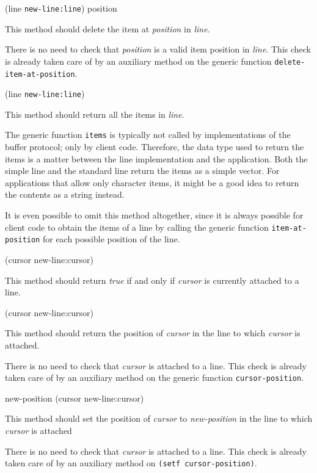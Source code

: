  {(line \texttt{new-line:line}) position}

This method should delete the item at \textit{position} in \textit{line}.

There is no need to check that \textit{position} is a valid item
position in \textit{line}.  This check is already taken care of by an
auxiliary method on the generic function
\texttt{delete-item-at-position}.

 {(line \texttt{new-line:line})}

This method should return all the items in \textit{line}.

The generic function \texttt{items} is typically not called by
implementations of the buffer protocol; only by client code.
Therefore, the data type used to return the items is a matter between
the line implementation and the application.  Both the simple line
 and the standard line
 return the items as a simple
vector.  For applications that allow only character items, it might be
a good idea to return the contents as a string instead.

It is even possible to omit this method altogether, since it is always
possible for client code to obtain the items of a line by calling the
generic function \texttt{item-at-position} for each possible position
of the line.

 {(cursor new-line:cursor)}

This method should return \emph{true} if and only if \textit{cursor}
is currently attached to a line.


 {(cursor new-line:cursor)}

This method should return the position of \textit{cursor} in the line
to which \textit{cursor} is attached.

There is no need to check that \textit{cursor} is attached to a line.
This check is already taken care of by an auxiliary method on the
generic function \texttt{cursor-position}.

 {new-position (cursor new-line:cursor)}

This method should set the position of \textit{cursor} to
\textit{new-position} in the line to which \textit{cursor} is attached

There is no need to check that \textit{cursor} is attached to a line.
This check is already taken care of by an auxiliary method on
\texttt{(setf cursor-position)}.

